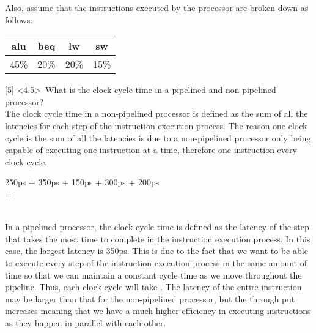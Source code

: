 \documentclass[12pt]{article}
\begin{document}
	\vspace{0.2cm}
	\noindent Also, assume that the instructions executed by the processor are broken down as follows: \\
	\begin{center}
		
		\begin{tabular}{ |c|c|c|c| } 
			\hline
			alu & beq & lw & sw  \\
			\hline
			45\% & 20\% & 20\% & 15\% \\
			\hline
		\end{tabular}
		
	\end{center}
	
	\newpage
	
	\noindent {} 
	[5] \textless4.5\textgreater \ What is the clock cycle time in a pipelined and non-pipelined processor? \vspace{0.2cm} \\
	
	The clock cycle time in a non-pipelined processor is defined as the sum of all the latencies for each step of the instruction execution process. The reason one clock cycle is the sum of all the latencies is due to a non-pipelined processor only being capable of executing one instruction at a time, therefore one instruction every clock cycle. \vspace{0.1cm} \\
	
	\begin{center}
	
		250ps + 350ps + 150ps + 300ps + 200ps \\
		= \\
		 \vspace{0.2cm}\\
	
	\end{center}
	
	In a pipelined processor, the clock cycle time is defined as the latency of the step that takes the most time to complete in the instruction execution process. In this case, the largest latency is 350ps. This is due to the fact that we want to be able to execute every step of the instruction execution process in the same amount of time so that we can maintain a constant cycle time as we move throughout the pipeline. Thus, each clock cycle will take . The latency of the entire instruction may be larger than that for the non-pipelined processor, but the through put increases meaning that we have a much higher efficiency in executing instructions as they happen in parallel with each other. \vspace{0.3cm} \\
	
\end{document}
